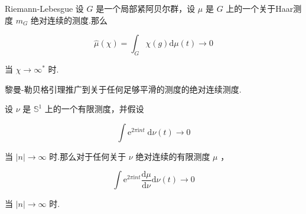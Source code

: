 \documentclass[lang=cn,a4paper,11pt,openany,scheme=chinese]{elegantbook}
\makeatletter
\newcommand\setboxcounter[2]{\setcounter{tcb@cnt@#1}{#2}}
\makeatother
\begin{document}
\setboxcounter{lemma}{14}
\begin{lemma}{Riemann-Lebesgue}
    设 \(G\) 是一个局部紧阿贝尔群，设 \(\mu\) 是 \(G\) 上的一个关于Haar测度 \({m}_{G}\) 绝对连续的测度.那么

\[
\widehat{\mu }\left( \chi \right)  = {\int }_{G}\chi \left( g\right) \mathrm{d}\mu \left( t\right)  \rightarrow  0
\]

当 \(\chi  \rightarrow  {\infty }^{ * }\) 时.
\end{lemma}


黎曼-勒贝格引理推广到关于任何足够平滑的测度的绝对连续测度.
\begin{lemma}{}
    设 \(\nu\) 是 \({\mathbb{S}}^{1}\) 上的一个有限测度，并假设

\[
\int {\mathrm{e}}^{{2\pi }\mathrm{i}{nt}}\mathrm{\;d}\nu \left( t\right)  \rightarrow  0
\]

当 \(\left| n\right|  \rightarrow  \infty\) 时.那么对于任何关于 \(\nu\) 绝对连续的有限测度 \(\mu\) ，

\[
\int {\mathrm{e}}^{{2\pi }\mathrm{i}{nt}}\frac{\mathrm{d}\mu }{\mathrm{d}\nu }\mathrm{d}\nu \left( t\right)  \rightarrow  0
\]

当 \(\left| n\right|  \rightarrow  \infty\) 时.
\end{lemma}
\end{document}
